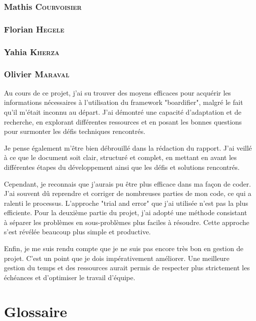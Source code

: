 \subsection*{Mathis \textsc{Courvoisier}}

\subsection*{Florian \textsc{Hegele}}

\subsection*{Yahia \textsc{Kherza}}

\subsection*{Olivier \textsc{Maraval}}

Au cours de ce projet, j'ai su trouver des moyens efficaces pour acquérir les informations nécessaires à l'utilisation du framework "boardifier", malgré le fait qu'il m'était inconnu au départ. J'ai démontré une capacité d'adaptation et de recherche, en explorant différentes ressources et en posant les bonnes questions pour surmonter les défis techniques rencontrés.

Je pense également m'être bien débrouillé dans la rédaction du rapport. J'ai veillé à ce que le document soit clair, structuré et complet, en mettant en avant les différentes étapes du développement ainsi que les défis et solutions rencontrés.

Cependant, je reconnais que j'aurais pu être plus efficace dans ma façon de coder. J'ai souvent dû reprendre et corriger de nombreuses parties de mon code, ce qui a ralenti le processus. L'approche "trial and error" que j'ai utilisée n'est pas la plus efficiente. Pour la deuxième partie du projet, j'ai adopté une méthode consistant à séparer les problèmes en sous-problèmes plus faciles à résoudre. Cette approche s'est révélée beaucoup plus simple et productive.

Enfin, je me suis rendu compte que je ne suis pas encore très bon en gestion de projet. C'est un point que je dois impérativement améliorer. Une meilleure gestion du temps et des ressources aurait permis de respecter plus strictement les échéances et d'optimiser le travail d'équipe.

\chapter{Glossaire}
\setcounter{page}{1}
\renewcommand{\thepage}{\Roman{page}}

